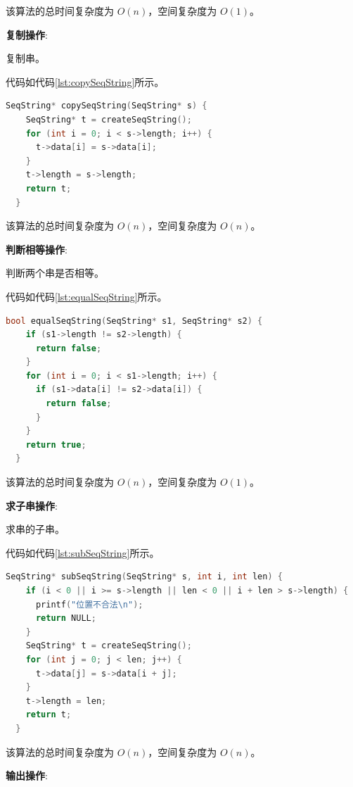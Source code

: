 \documentclass[lang=cn,newtx,10pt,scheme=chinese]{../elegantbook}
\begin{document}
该算法的总时间复杂度为 $O(n)$，空间复杂度为 $O(1)$。


\textbf{复制操作}:

复制串。

代码如代码\ref{lst:copySeqString}所示。

\begin{lstlisting}[language=C++, caption={复制串示例代码}, label={lst:copySeqString}]
  SeqString* copySeqString(SeqString* s) {
    SeqString* t = createSeqString();
    for (int i = 0; i < s->length; i++) {
      t->data[i] = s->data[i];
    }
    t->length = s->length;
    return t;
  }

\end{lstlisting}

该算法的总时间复杂度为 $O(n)$，空间复杂度为 $O(n)$。


\textbf{判断相等操作}:

判断两个串是否相等。

代码如代码\ref{lst:equalSeqString}所示。

\begin{lstlisting}[language=C++, caption={判断两个串是否相等示例代码}, label={lst:equalSeqString}]
  bool equalSeqString(SeqString* s1, SeqString* s2) {
    if (s1->length != s2->length) {
      return false;
    }
    for (int i = 0; i < s1->length; i++) {
      if (s1->data[i] != s2->data[i]) {
        return false;
      }
    }
    return true;
  }

\end{lstlisting}

该算法的总时间复杂度为 $O(n)$，空间复杂度为 $O(1)$。


\textbf{求子串操作}:

求串的子串。

代码如代码\ref{lst:subSeqString}所示。

\begin{lstlisting}[language=C++, caption={求串的子串示例代码}, label={lst:subSeqString}]
  SeqString* subSeqString(SeqString* s, int i, int len) {
    if (i < 0 || i >= s->length || len < 0 || i + len > s->length) {
      printf("位置不合法\n");
      return NULL;
    }
    SeqString* t = createSeqString();
    for (int j = 0; j < len; j++) {
      t->data[j] = s->data[i + j];
    }
    t->length = len;
    return t;
  }

\end{lstlisting}

该算法的总时间复杂度为 $O(n)$，空间复杂度为 $O(n)$。


\textbf{输出操作}:
\end{document}
